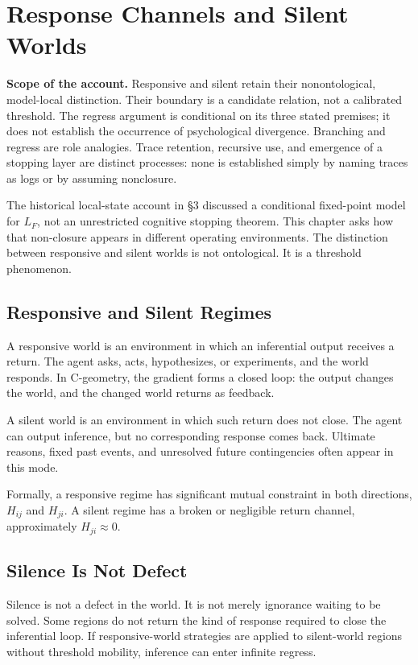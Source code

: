 \section{Response Channels and Silent Worlds}

\noindent\textbf{Scope of the account.} Responsive and silent retain their nonontological, model-local distinction. Their boundary is a candidate relation, not a calibrated threshold. The regress argument is conditional on its three stated premises; it does not establish the occurrence of psychological divergence. Branching and regress are role analogies. Trace retention, recursive use, and emergence of a stopping layer are distinct processes: none is established simply by naming traces as logs or by assuming nonclosure.


The historical local-state account in \S{}3 discussed a conditional fixed-point model for $L_F$, not an unrestricted cognitive stopping theorem. This chapter asks how that non-closure appears in different operating environments. The distinction between responsive and silent worlds is not ontological. It is a threshold phenomenon.

\subsection{Responsive and Silent Regimes}

A responsive world is an environment in which an inferential output receives a return. The agent asks, acts, hypothesizes, or experiments, and the world responds. In C-geometry, the gradient forms a closed loop: the output changes the world, and the changed world returns as feedback.

A silent world is an environment in which such return does not close. The agent can output inference, but no corresponding response comes back. Ultimate reasons, fixed past events, and unresolved future contingencies often appear in this mode.

Formally, a responsive regime has significant mutual constraint in both directions, $H_{ij}$ and $H_{ji}$. A silent regime has a broken or negligible return channel, approximately $H_{ji}\approx 0$.

\subsection{Silence Is Not Defect}

Silence is not a defect in the world. It is not merely ignorance waiting to be solved. Some regions do not return the kind of response required to close the inferential loop. If responsive-world strategies are applied to silent-world regions without threshold mobility, inference can enter infinite regress.

